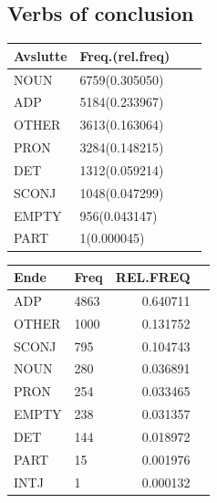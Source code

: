 \documentclass{article}
\begin{document}
\subsection{Verbs of conclusion}
\vspace{1cm}

    \begin{minipage}{.3\textwidth}
      \centering
    \begin{tabular}{llrr}
    \toprule
    \midrule
    Avslutte &  Freq.(rel.freq) \\
    \midrule
    NOUN &  6759(0.305050) \\
    ADP &  5184(0.233967) \\
    OTHER &  3613(0.163064) \\
    PRON &  3284(0.148215) \\
    DET &  1312(0.059214) \\
    SCONJ &  1048(0.047299) \\
    EMPTY &   956(0.043147) \\
    PART &     1(0.000045) \\
    \bottomrule
    \end{tabular}
\label{tab:avslutte_POS}
    \end{minipage}%
\hfill
\begin{minipage}{.5\textwidth}
  \centering
\begin{tabular}{llrr}
    \toprule
    \midrule
Ende &  Freq &  REL.FREQ \\
\midrule
ADP &  4863 &  0.640711 \\
OTHER &  1000 &  0.131752 \\
SCONJ &   795 &  0.104743 \\
NOUN &   280 &  0.036891 \\
PRON &   254 &  0.033465 \\
EMPTY &   238 &  0.031357 \\
DET &   144 &  0.018972 \\
PART &    15 &  0.001976 \\
INTJ &     1 &  0.000132 \\
\bottomrule
\end{tabular}
 \label{tab:ende_POS}
\end{minipage}

\vspace{1cm}
\end{document}
